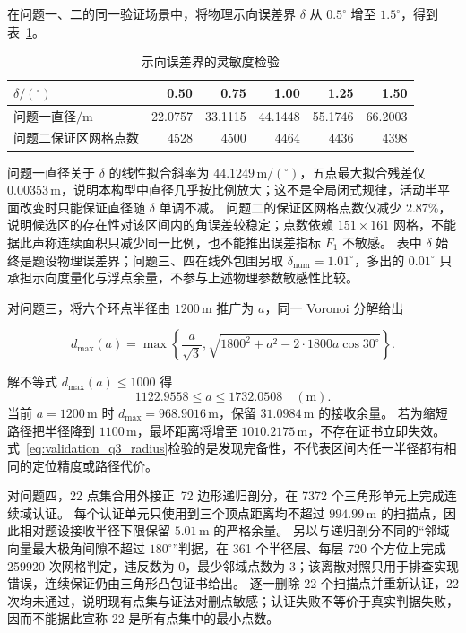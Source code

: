 在问题一、二的同一验证场景中，将物理示向误差界 $\delta$ 从
$0.5^\circ$ 增至 $1.5^\circ$，得到表~\ref{tab:validation_delta}。

\begin{table}[htbp]
\centering
\caption{示向误差界的灵敏度检验}
\label{tab:validation_delta}
\small
\begin{tabular}{lrrrrr}
\toprule
$\delta/(^\circ)$ & 0.50 & 0.75 & 1.00 & 1.25 & 1.50 \\
\midrule
问题一直径$/\mathrm m$ & 22.0757 & 33.1115 & 44.1448 & 55.1746 & 66.2003 \\
问题二保证区网格点数 & 4528 & 4500 & 4464 & 4436 & 4398 \\
\bottomrule
\end{tabular}
\end{table}

问题一直径关于 $\delta$ 的线性拟合斜率为
$44.1249\,\mathrm{m}/(^\circ)$，五点最大拟合残差仅 $0.00353\,\mathrm m$，说明本构型中直径几乎按比例放大；这不是全局闭式规律，活动半平面改变时只能保证直径随 $\delta$ 单调不减。
问题二的保证区网格点数仅减少 $2.87\%$，说明候选区的存在性对该区间内的角误差较稳定；点数依赖 $151\times161$ 网格，不能据此声称连续面积只减少同一比例，也不能推出误差指标 $F_1$ 不敏感。
表中 $\delta$ 始终是题设物理误差界；问题三、四在线外包围另取
$\delta_{\mathrm{num}}=1.01^\circ$，多出的 $0.01^\circ$ 只承担示向度量化与浮点余量，不参与上述物理参数敏感性比较。

对问题三，将六个环点半径由 $1200\,\mathrm m$ 推广为 $a$，同一 Voronoi 分解给出

\begin{equation}
d_{\max}(a)=\max\left\{\frac{a}{\sqrt3},
\sqrt{1800^2+a^2-2\cdot1800a\cos30^\circ}\right\}.
\label{eq:validation_q3_radius}
\end{equation}

解不等式 $d_{\max}(a)\le1000$ 得
\[
1122.9558\le a\le1732.0508\quad(\mathrm m).
\]
当前 $a=1200\,\mathrm m$ 时 $d_{\max}=968.9016\,\mathrm m$，保留
$31.0984\,\mathrm m$ 的接收余量。
若为缩短路径把半径降到 $1100\,\mathrm m$，最坏距离将增至
$1010.2175\,\mathrm m$，不存在证书立即失效。
式~\eqref{eq:validation_q3_radius}检验的是发现完备性，不代表区间内任一半径都有相同的定位精度或路径代价。

对问题四，22 点集合用外接正~72 边形递归剖分，在 7372 个三角形单元上完成连续域认证。
每个认证单元只使用到三个顶点距离均不超过 $994.99\,\mathrm m$ 的扫描点，因此相对题设接收半径下限保留
$5.01\,\mathrm m$ 的严格余量。
另以与递归剖分不同的“邻域向量最大极角间隙不超过 $180^\circ$”判据，在 361 个半径层、每层 720 个方位上完成
259920 次网格判定，违反数为 0，最少邻域点数为 3；该离散对照只用于排查实现错误，连续保证仍由三角形凸包证书给出。
逐一删除 22 个扫描点并重新认证，22 次均未通过，说明现有点集与证法对删点敏感；认证失败不等价于真实判据失败，因而不能据此宣称 22 是所有点集中的最小点数。

